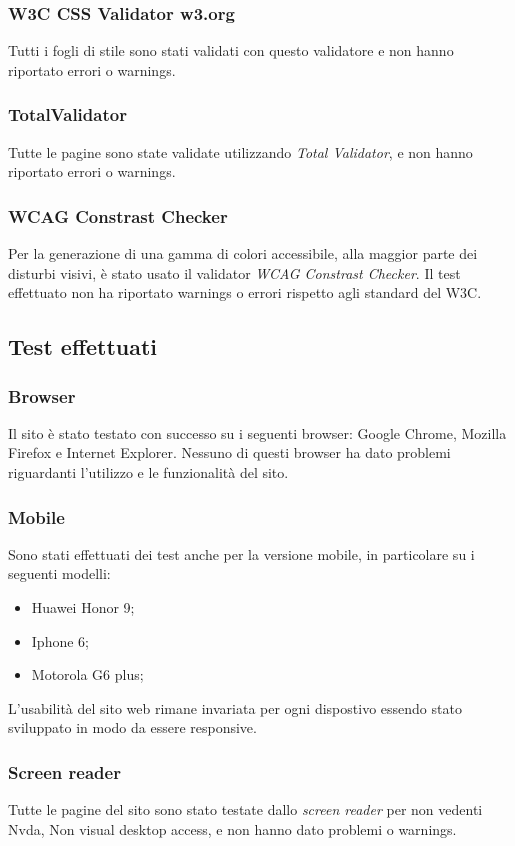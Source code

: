 \subsubsection{W3C CSS Validator w3.org}
Tutti i fogli di stile sono stati validati con questo validatore e non hanno riportato errori o warnings.

\subsubsection{TotalValidator}
Tutte le pagine sono state validate utilizzando \textit{Total Validator}, e non hanno riportato errori o warnings.

\subsubsection{WCAG Constrast Checker}
Per la generazione di una gamma di colori accessibile, alla maggior parte dei disturbi visivi, è stato usato il validator \textit{WCAG Constrast Checker}. Il test effettuato non ha riportato warnings o errori rispetto agli standard del W3C.
\subsection{Test effettuati}

\subsubsection{Browser}
Il sito è stato testato con successo su i seguenti browser: Google Chrome, Mozilla Firefox e Internet Explorer. Nessuno di questi browser ha dato problemi riguardanti l'utilizzo e le funzionalità del sito.

\subsubsection{Mobile}
Sono stati effettuati dei test anche per la versione mobile, in particolare su i seguenti modelli:
\begin{itemize}
	\item Huawei Honor 9;
	\item Iphone 6; 
	\item Motorola G6 plus;
\end{itemize}
L’usabilità del sito web rimane invariata per ogni dispostivo essendo stato sviluppato in modo da essere responsive.

\subsubsection{Screen reader}
Tutte le pagine del sito sono stato testate dallo \textit{screen reader} per non vedenti Nvda, Non visual desktop access, e non hanno dato problemi o warnings. 

